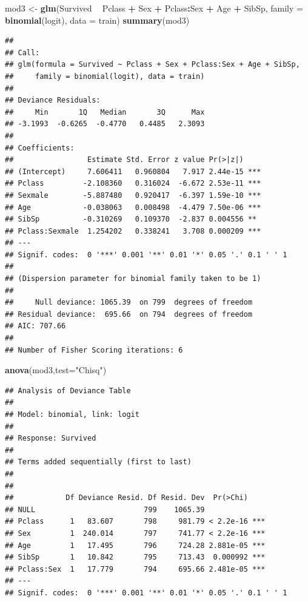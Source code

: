 \documentclass[]{book}
\newenvironment{Shaded}{\begin{snugshade}}{\end{snugshade}}
\newcommand{\KeywordTok}[1]{\textcolor[rgb]{0.13,0.29,0.53}{\textbf{#1}}}
\newcommand{\DataTypeTok}[1]{\textcolor[rgb]{0.13,0.29,0.53}{#1}}
\newcommand{\StringTok}[1]{\textcolor[rgb]{0.31,0.60,0.02}{#1}}
\newcommand{\OperatorTok}[1]{\textcolor[rgb]{0.81,0.36,0.00}{\textbf{#1}}}
\newcommand{\NormalTok}[1]{#1}
\begin{document}
\begin{Shaded}
\begin{Highlighting}[]
\NormalTok{mod3 <-}\StringTok{  }\KeywordTok{glm}\NormalTok{(Survived }\OperatorTok{~}\StringTok{ }\NormalTok{Pclass }\OperatorTok{+}\StringTok{ }\NormalTok{Sex }\OperatorTok{+}\StringTok{ }\NormalTok{Pclass}\OperatorTok{:}\NormalTok{Sex }\OperatorTok{+}\StringTok{ }\NormalTok{Age }\OperatorTok{+}\StringTok{ }\NormalTok{SibSp, }\DataTypeTok{family =} \KeywordTok{binomial}\NormalTok{(logit), }\DataTypeTok{data =}\NormalTok{ train)}
\KeywordTok{summary}\NormalTok{(mod3)}
\end{Highlighting}
\end{Shaded}

\begin{verbatim}
## 
## Call:
## glm(formula = Survived ~ Pclass + Sex + Pclass:Sex + Age + SibSp, 
##     family = binomial(logit), data = train)
## 
## Deviance Residuals: 
##     Min       1Q   Median       3Q      Max  
## -3.1993  -0.6265  -0.4770   0.4485   2.3093  
## 
## Coefficients:
##                 Estimate Std. Error z value Pr(>|z|)    
## (Intercept)     7.606411   0.960804   7.917 2.44e-15 ***
## Pclass         -2.108360   0.316024  -6.672 2.53e-11 ***
## Sexmale        -5.887480   0.920417  -6.397 1.59e-10 ***
## Age            -0.038063   0.008498  -4.479 7.50e-06 ***
## SibSp          -0.310269   0.109370  -2.837 0.004556 ** 
## Pclass:Sexmale  1.254202   0.338241   3.708 0.000209 ***
## ---
## Signif. codes:  0 '***' 0.001 '**' 0.01 '*' 0.05 '.' 0.1 ' ' 1
## 
## (Dispersion parameter for binomial family taken to be 1)
## 
##     Null deviance: 1065.39  on 799  degrees of freedom
## Residual deviance:  695.66  on 794  degrees of freedom
## AIC: 707.66
## 
## Number of Fisher Scoring iterations: 6
\end{verbatim}

\begin{Shaded}
\begin{Highlighting}[]
\KeywordTok{anova}\NormalTok{(mod3,}\DataTypeTok{test=}\StringTok{"Chisq"}\NormalTok{)}
\end{Highlighting}
\end{Shaded}

\begin{verbatim}
## Analysis of Deviance Table
## 
## Model: binomial, link: logit
## 
## Response: Survived
## 
## Terms added sequentially (first to last)
## 
## 
##            Df Deviance Resid. Df Resid. Dev  Pr(>Chi)    
## NULL                         799    1065.39              
## Pclass      1   83.607       798     981.79 < 2.2e-16 ***
## Sex         1  240.014       797     741.77 < 2.2e-16 ***
## Age         1   17.495       796     724.28 2.881e-05 ***
## SibSp       1   10.842       795     713.43  0.000992 ***
## Pclass:Sex  1   17.779       794     695.66 2.481e-05 ***
## ---
## Signif. codes:  0 '***' 0.001 '**' 0.01 '*' 0.05 '.' 0.1 ' ' 1
\end{verbatim}
\end{document}
